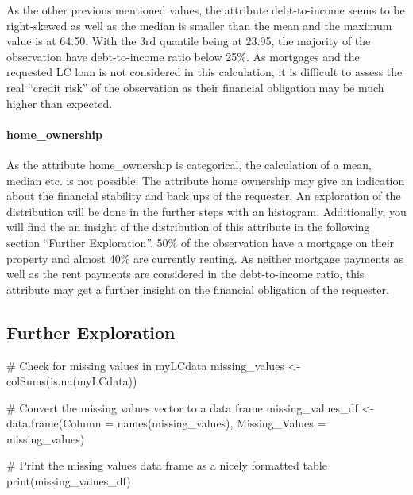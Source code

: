 \documentclass[
  letterpaper,
  DIV=11,
  numbers=noendperiod]{scrartcl}
\let\oldparagraph\paragraph
\renewcommand{\paragraph}[1]{\oldparagraph{#1}\mbox{}}
\newenvironment{Shaded}{\begin{snugshade}}{\end{snugshade}}
\newcommand{\AttributeTok}[1]{\textcolor[rgb]{0.40,0.45,0.13}{#1}}
\newcommand{\CommentTok}[1]{\textcolor[rgb]{0.37,0.37,0.37}{#1}}
\newcommand{\FunctionTok}[1]{\textcolor[rgb]{0.28,0.35,0.67}{#1}}
\newcommand{\NormalTok}[1]{\textcolor[rgb]{0.00,0.23,0.31}{#1}}
\newcommand{\OtherTok}[1]{\textcolor[rgb]{0.00,0.23,0.31}{#1}}
\begin{document}
As the other previous mentioned values, the attribute debt-to-income
seems to be right-skewed as well as the median is smaller than the mean
and the maximum value is at 64.50. With the 3rd quantile being at 23.95,
the majority of the observation have debt-to-income ratio below 25\%. As
mortgages and the requested LC loan is not considered in this
calculation, it is difficult to assess the real ``credit risk'' of the
observation as their financial obligation may be much higher than
expected.

\hypertarget{home_ownership}{%
\paragraph{home\_ownership}\label{home_ownership}}

As the attribute home\_ownership is categorical, the calculation of a
mean, median etc. is not possible. The attribute home ownership may give
an indication about the financial stability and back ups of the
requester. An exploration of the distribution will be done in the
further steps with an histogram. Additionally, you will find the an
insight of the distribution of this attribute in the following section
``Further Exploration''. 50\% of the observation have a mortgage on
their property and almost 40\% are currently renting. As neither
mortgage payments as well as the rent payments are considered in the
debt-to-income ratio, this attribute may get a further insight on the
financial obligation of the requester.

\hypertarget{further-exploration}{%
\subsection{Further Exploration}\label{further-exploration}}

\begin{Shaded}
\begin{Highlighting}[]
\CommentTok{\# Check for missing values in myLCdata}
\NormalTok{missing\_values }\OtherTok{\textless{}{-}} \FunctionTok{colSums}\NormalTok{(}\FunctionTok{is.na}\NormalTok{(myLCdata))}

\CommentTok{\# Convert the missing values vector to a data frame}
\NormalTok{missing\_values\_df }\OtherTok{\textless{}{-}} \FunctionTok{data.frame}\NormalTok{(}\AttributeTok{Column =} \FunctionTok{names}\NormalTok{(missing\_values), }\AttributeTok{Missing\_Values =}\NormalTok{ missing\_values)}

\CommentTok{\# Print the missing values data frame as a nicely formatted table}
\FunctionTok{print}\NormalTok{(missing\_values\_df)}
\end{Highlighting}
\end{Shaded}
\end{document}
